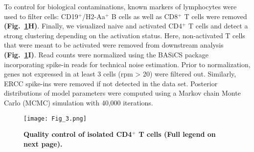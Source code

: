 To control for biological contaminations, known markers of lymphocytes were used to filter cells: CD19$^+$/H2-Aa$^+$ B cells as well as CD8$^+$ T cells were removed \textbf{(Fig.~\ref{fig1:QC}H)}. Finally, we visualized naive and activated CD4$^+$ T cells and detect a strong clustering depending on the activation status. Here, non-activated T cells that were meant to be activated were removed from downstream analysis \textbf{(Fig.~\ref{fig1:QC}I)}. Read counts were normalized using the BASiCS package \citep{Vallejos2015} incorporating spike-in reads for technical noise estimation. Prior to normalization, genes not expressed in at least 3 cells (rpm > 20) were filtered out. Similarly, ERCC spike-ins were removed if not detected in the data set. Posterior distributions of model parameters were computed using a Markov chain Monte Carlo (MCMC) simulation with 40,000 iterations.   

\begin{figure}[!hb]
\centering
\texttt{[image: Fig\_3.png]}
\caption[Quality control of isolated CD4$^+$ T cells]{\textbf{Quality control of isolated CD4$^+$ T cells (Full legend on next page).}}
\label{fig1:QC}
\end{figure}

\newpage

